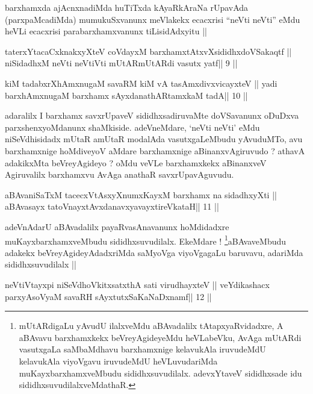 \begin{artha}
barxhamxda ajAcnxnadiMda huTiTxda kAyaRkAraNa rUpavAda (parxpaMcadiMda)
mumukuSxvanunx meVlakekx ecacxrisi ``neVti neVti'' eMdu heVLi ecacxrisi
parabarxhamxvanunx tiLisidAdxyitu ||
\end{artha}


\begin{shl}
taterxYtacaCxknakxyXteV coVdayxM barxhamxtAtxvXsididhxdoVSakaqtf ||
niSidadhxM neVti neVtiVti mUtARmUtARdi vasutx yatf\hfill || 9 ||
\end{shl}

\begin{shl}
kiM tadabxrXhAmxnugaM savaRM kiM vA tasAmxdivxvicayxteV ||
yadi barxhAmxnugaM barxhamx sAyxdanathARtamxkaM tadA\hfill || 10 ||
\end{shl}

\begin{artha}
adaralilx I barxhamx savxrUpaveV sididhxsadiruvaMte doVSavanunx
oDuDxva parxshenxyoMdanunx shaMkiside. adeVneMdare, `neVti neVti' eMdu
niSeVdhisidadx mUtaR amUtaR modalAda vasutxgaLeMbudu yAvuduMTo, avu
barxhamxnige hoMdiveyoV aMdare barxhamxnige aBinanxvAgiruvudo ?
athavA adakikxMta beVreyAgideyo ? oMdu veVLe barxhamxkekx  aBinanxveV
Agiruvalilx barxhamxvu AvAga anathaR savxrUpavAguvudu. 
\end{artha}

\begin{shl}
aBAvaniSaTxM tacecxVtAsxyXnumxKayxM barxhamx na sidadhxyXti ||
aBAvasayx tatoV\s nayxtAvxdanavxyavayxtireVkataH\hfill || 11 ||
\end{shl}

\begin{artha}
adeVnAdarU aBAvadalilx payaRvasAnavanunx hoMdidadxre
muKayxbarxhamxveMbudu sididhxsuvudilalx. EkeMdare
! \footnote[1]{mUtARdigaLu yAvudU ilalxveMdu aBAvadalilx
  tAtapxyaRvidadxre, A aBAvavu barxhamxkekx beVreyAgideyeMdu
  heVLabeVku, AvAga mUtARdi vasutxgaLa saMbaMdhavu barxhamxnige
  kelavukAla iruvudeMdU kelavukAla viyoVgavu iruvudeMdU heVLuvudariMda
  muKayxbarxhamxveMbudu sididhxsuvudilalx. adevxYtaveV sididhxsade idu
  sididhxsuvudilalxveMdathaR.}aBAvaveMbudu adakekx beVreyAgideyAdadxriMda saMyoVga
viyoVgagaLu baruvavu, adariMda sididhxsuvudilalx ||
\end{artha}

\begin{shl}
neVtiVtayxpi niSeVdhoVkitxsatxthA sati virudhayxteV ||
veYdikashacx parxyAsoV\s yaM savaRH sAyxtutxSaKaNaDxnamf\hfill || 12 ||
\end{shl}

